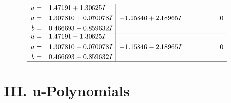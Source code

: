 \documentclass[1p]{elsarticle_modified}
\theoremstyle{definition}
\begin{document}
$$\begin{array}{c|c|c}
\begin{aligned}
u &= \phantom{-}1.47191 + 1.30625 I \\
a &= \phantom{-}1.307810 + 0.070078 I \\
b &= \phantom{-}0.466693 - 0.859632 I\end{aligned}
 & -1.15846 + 2.18965 I & \phantom{-0.000000 } 0 \\ \hline\begin{aligned}
u &= \phantom{-}1.47191 - 1.30625 I \\
a &= \phantom{-}1.307810 - 0.070078 I \\
b &= \phantom{-}0.466693 + 0.859632 I\end{aligned}
 & -1.15846 - 2.18965 I & \phantom{-0.000000 } 0\\
 \hline 
 \end{array}$$\newpage
\newpage\renewcommand{\arraystretch}{1}
\centering \section*{ III. u-Polynomials}
\end{document}
